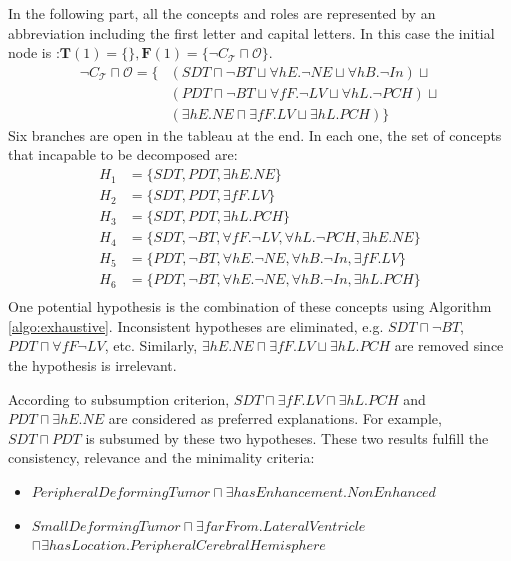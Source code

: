 \documentclass{article}
\begin{document}
In the following part, all the concepts and roles are represented by an abbreviation including the first letter and capital letters.
In this case the initial node is :$\mathbf{T}(1)=\{\}, \mathbf{F}(1)=\{\neg C_\mathcal{T}\sqcap \mathcal{O}\}$.
\begin{align*}
 \neg C_\mathcal{T}\sqcap \mathcal{O}= \{ &(SDT \sqcap \neg BT \sqcup \forall hE. \neg NE \sqcup \forall hB. \neg In) \sqcup \\
 &(PDT \sqcap \neg BT \sqcup \forall fF. \neg LV \sqcup \forall hL. \neg PCH) \sqcup \\
 &(\exists hE. NE \sqcap \exists fF. LV \sqcup \exists hL.PCH )\}
\end{align*}
Six branches are open in the tableau at the end. In each one, the set of concepts that incapable to be decomposed are:
 \begin{align*}
  H_1&=\{ SDT, PDT, \exists hE.NE\}\\
  H_2&=\{ SDT, PDT, \exists fF.LV\}\\
  H_3&=\{ SDT, PDT, \exists hL.PCH\}\\
  H_4&=\{ SDT, \neg BT, \forall fF. \neg LV, \forall hL. \neg PCH, \exists hE.NE\}\\
  H_5&=\{ PDT, \neg BT, \forall hE. \neg NE, \forall hB. \neg In, \exists fF.LV\}\\
  H_6&=\{ PDT, \neg BT, \forall hE. \neg NE, \forall hB. \neg In, \exists hL.PCH\}\\
 \end{align*}
One potential hypothesis is the combination of these concepts using Algorithm \ref{algo:exhaustive}.
Inconsistent hypotheses are eliminated, e.g.
 $SDT \sqcap \neg BT$, 
$PDT \sqcap \forall fF \neg LV$, etc.
Similarly,
$\exists hE. NE \sqcap \exists fF. LV \sqcup \exists hL.PCH $
are removed since the hypothesis is irrelevant.

According to subsumption criterion, $SDT \sqcap \exists fF.LV \sqcap \exists hL.PCH$
and $PDT \sqcap \exists hE.NE$ are considered as preferred explanations. For example, 
$SDT \sqcap PDT$ is subsumed by these two hypotheses. 
These two results fulfill the consistency, relevance and the minimality criteria:
\begin{itemize}
 \item $PeripheralDeformingTumor \sqcap \exists hasEnhancement. NonEnhanced$
 \item $SmallDeformingTumor\sqcap \exists farFrom. LateralVentricle $\\ $\sqcap \exists hasLocation. PeripheralCerebralHemisphere$
\end{itemize}




\end{document}
